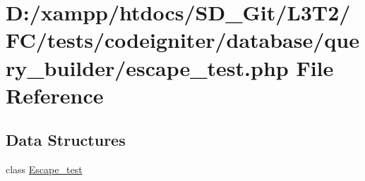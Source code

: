 \hypertarget{tests_2codeigniter_2database_2query__builder_2escape__test_8php}{}\section{D\+:/xampp/htdocs/\+S\+D\+\_\+\+Git/\+L3\+T2/\+F\+C/tests/codeigniter/database/query\+\_\+builder/escape\+\_\+test.php File Reference}
\label{tests_2codeigniter_2database_2query__builder_2escape__test_8php}
\subsection*{Data Structures}
\begin{DoxyCompactItemize}
\item 
class \hyperlink{class_escape__test}{Escape\+\_\+test}
\end{DoxyCompactItemize}
